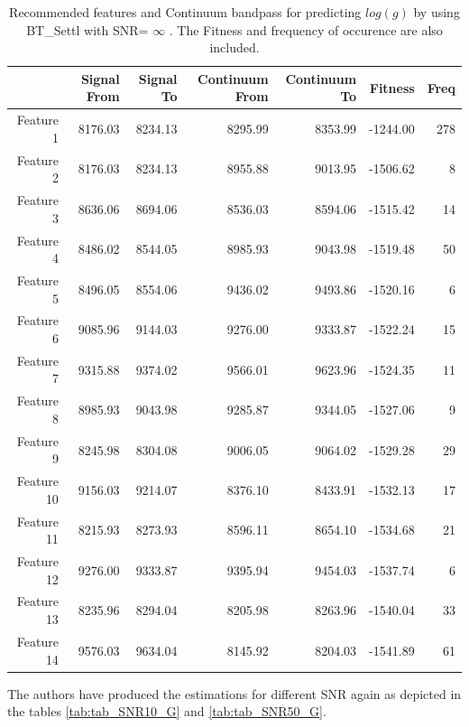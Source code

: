 {{\begin{table}
\begin{center}
\begin{tabular}{rrrrrrr}
  \hline
 & Signal From & Signal To & Continuum From & Continuum To & Fitness & Freq \\ 
  \hline
Feature 1 & 8176.03 & 8234.13 & 8295.99 & 8353.99 & -1244.00 & 278 \\ 
  Feature 2 & 8176.03 & 8234.13 & 8955.88 & 9013.95 & -1506.62 &   8 \\ 
  Feature 3 & 8636.06 & 8694.06 & 8536.03 & 8594.06 & -1515.42 &  14 \\ 
  Feature 4 & 8486.02 & 8544.05 & 8985.93 & 9043.98 & -1519.48 &  50 \\ 
  Feature 5 & 8496.05 & 8554.06 & 9436.02 & 9493.86 & -1520.16 &   6 \\ 
  Feature 6 & 9085.96 & 9144.03 & 9276.00 & 9333.87 & -1522.24 &  15 \\ 
  Feature 7 & 9315.88 & 9374.02 & 9566.01 & 9623.96 & -1524.35 &  11 \\ 
  Feature 8 & 8985.93 & 9043.98 & 9285.87 & 9344.05 & -1527.06 &   9 \\ 
  Feature 9 & 8245.98 & 8304.08 & 9006.05 & 9064.02 & -1529.28 &  29 \\ 
  Feature 10 & 9156.03 & 9214.07 & 8376.10 & 8433.91 & -1532.13 &  17 \\ 
  Feature 11 & 8215.93 & 8273.93 & 8596.11 & 8654.10 & -1534.68 &  21 \\ 
  Feature 12 & 9276.00 & 9333.87 & 9395.94 & 9454.03 & -1537.74 &   6 \\ 
  Feature 13 & 8235.96 & 8294.04 & 8205.98 & 8263.96 & -1540.04 &  33 \\ 
  Feature 14 & 9576.03 & 9634.04 & 8145.92 & 8204.03 & -1541.89 &  61 \\ 
   \hline
\end{tabular}
\caption {Recommended features and Continuum bandpass for predicting $log(g)$ 
      by using BT\_Settl with SNR= $ \infty $ . 
      The Fitness and frequency of occurence are also included.} \label{tab:tab_SNRoo_G} 
\end{center}
\end{table}

The authors have produced the estimations for different SNR again 
as depicted in the tables \ref{tab:tab_SNR10_G} and \ref{tab:tab_SNR50_G}.

}}
